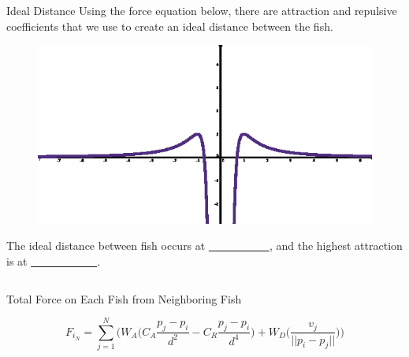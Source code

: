 \documentclass[final, xcolor=dvipsnames]{beamer}
\newlength{\onecolwid}
\newlength{\twocolwid}
\begin{document}
\begin{frame}[t]
\begin{columns}[t]
\begin{column}{\twocolwid}
\begin{columns}[t,totalwidth=\twocolwid]
\begin{column}{\onecolwid}
\begin{block}{Ideal Distance}
Using the force equation below, there are attraction and repulsive coefficients that we use to create an ideal distance between the fish. 
\begin{figure}
	\centering
	\includegraphics[scale=3]{coeff_plot2.eps}
\end{figure}
The ideal distance between fish occurs at \underline{~~~~~~~~~~~}, and the highest attraction is at \underline{~~~~~~~~~~~~}.

\end{block}


\end{column} %

\end{columns} %


\begin{alertblock}{Total Force on Each Fish from Neighboring Fish}

\begin{equation*}
	F_{i_{N}} = \sum\limits_{j=1}^{N} \bigg( W_{A} \big(C_{A} \frac{p_{j}- p_{i}}{d^{2}} - C_{R}\frac{p_{j} - p_{i}}{d^{4}} \big) + W_{D} \big(\frac{v_{j}}{||p_{i} - p_{j}||} \big) \bigg)
\end{equation*}

\end{alertblock} 



\end{column}
\end{columns}
\end{frame}
\end{document}
